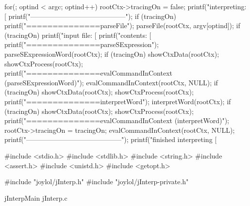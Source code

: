 {  for(; optind < argc; optind++) {
    rootCtx->tracingOn = false;
    printf("interpreting: [%
    printf("------------------------------------------\n");
    if (tracingOn) printf("==============\ncalling parseFile\n\n");
    parseFile(rootCtx, argv[optind]);
    if (tracingOn) {
      printf("input file: [%
      printf("contents:   [%
      printf("==============\ncalling parseSExpression\n\n");
    }
    parseSExpressionWord(rootCtx);
    if (tracingOn) {
      showCtxData(rootCtx);
      showCtxProcess(rootCtx);
      printf("==============\ncalling evalCommandInContext (parseSExpressionWord)\n\n");
    }
    evalCommandInContext(rootCtx, NULL);
    if (tracingOn) {
      showCtxData(rootCtx);
      showCtxProcess(rootCtx);
      printf("==============\ncalling interpretWord\n\n");
    }
    interpretWord(rootCtx);
    if (tracingOn) {
      showCtxData(rootCtx);
      showCtxProcess(rootCtx);
      printf("==============\ncalling evalCommandInContext (interpretWord)\n\n");
      rootCtx->tracingOn = tracingOn;
    }
    evalCommandInContext(rootCtx, NULL);
    printf("\n------------------------------------------\n");
    printf("finished interpreting [%
  }
}
\stopCCode

\startCCode
#include <stdio.h>
#include <stdlib.h>
#include <string.h>
#include <assert.h>
#include <unistd.h>
#include <getopt.h>

#include "joylol/jInterp.h"
#include "joylol/jInterp-private.h"
\stopCCode


\createCCodeFile%
  {jInterpMain}%
  {jInterp.c}%
  {}

